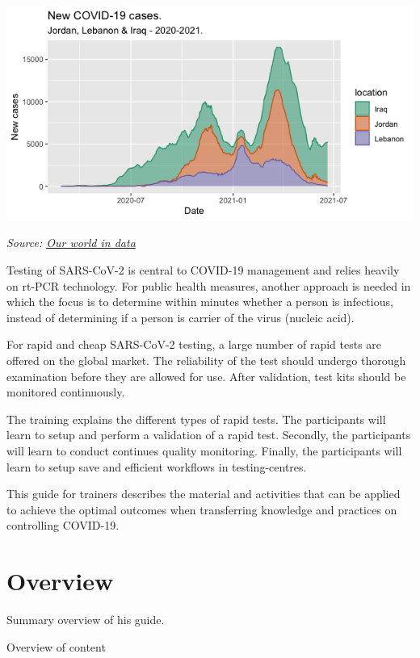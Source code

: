 \documentclass[
]{book}
\begin{document}
\includegraphics{images/covid19_ME.png}

\emph{Source: \href{https://ourworldindata.org/coronavirus}{Our world in data}}

Testing of SARS-CoV-2 is central to COVID-19 management and relies
heavily on rt-PCR technology. For public health measures, another
approach is needed in which the focus is to determine within minutes
whether a person is infectious, instead of determining if a person is
carrier of the virus (nucleic acid).

For rapid and cheap SARS-CoV-2 testing, a large number of rapid tests
are offered on the global market. The reliability of the test should
undergo thorough examination before they are allowed for use. After
validation, test kits should be monitored continuously.

The training explains the different types of rapid tests. The
participants will learn to setup and perform a validation of a rapid
test. Secondly, the participants will learn to conduct continues quality
monitoring. Finally, the participants will learn to setup save and
efficient workflows in testing-centres.

This guide for trainers describes the material and activities that can
be applied to achieve the optimal outcomes when transferring knowledge
and practices on controlling COVID-19.

\hypertarget{overview}{%
\chapter{Overview}\label{overview}}

Summary overview of his guide.

Overview of content
\end{document}
